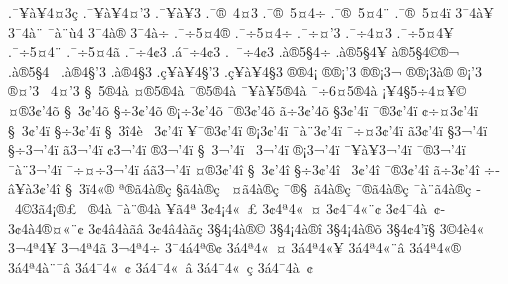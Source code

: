 {.^^af^^a5^^e0^^a54^^a43^^e7
.^^af^^a5^^e0^^a54^^a4'3
.^^af^^a5^^e0^^a53
.^^af^^ae^^ad^^a04^^a43
.^^af^^ae^^ad^^a05^^a44^^f7
.^^af^^ae^^ad^^a05^^a44^^a8
.^^af^^ae^^ad^^a05^^a44^^ef
3^^af4^^e0^^a5
3^^af4^^e0^^a8
^^af^^e0^^a8^^f94
3^^af4^^e0^^ae
3^^af4^^e0^^f7
.^^af^^f75^^a44^^ae
.^^af^^f75^^a44^^f7
.^^af^^f7^^a4'3
.^^af^^f74^^a43
.^^af^^f75^^a44^^a5
.^^af^^f75^^a44^^a8
.^^af^^f75^^a44^^e3
.^^af^^f74^^a23
.^^e1^^af^^f74^^a23
.^^ad^^a0^^af^^f74^^a23
.^^e0^^ae5^^a74^^f7
.^^e0^^ae5^^a74^^a5
^^e0^^ae5^^a74^^a9^^ae^^ac
.^^e0^^ae5^^a74^^a0
.^^e0^^ae4^^a7'3
.^^e0^^ae4^^a73
.^^e7^^a5^^e0^^a54^^a7'3
.^^e7^^a5^^e0^^a54^^a73
^^ae^^ae4^^a1
^^ae^^ae^^a1'3
^^ae^^ae^^a13^^ac
^^ae^^ae^^a13^^e0^^ae
^^ae^^a1'3
^^ae^^a4'3
^^ad^^a04^^a4'3
^^a7^^a05^^ae4^^e0
^^a4^^ae5^^ae4^^e0
^^af^^ae5^^ae4^^e0
^^af^^a5^^e0^^a55^^ae4^^e0
^^af^^f76^^a45^^ae4^^e0
^^a1^^a54^^a75^^f74^^a4^^a5^^a9
^^a4^^ae3^^a2'4^^f5
^^a7^^a03^^a2'4^^f5
^^a7^^f73^^a2'4^^f5
^^ae^^a1^^f73^^a2'4^^f5
^^af^^ae3^^a2'4^^f5
^^e3^^f73^^a2'4^^f5
^^a73^^a2'4^^ef
^^af^^ae3^^a2'4^^ef
^^a2^^f7^^a43^^a2'4^^ef
^^a7^^a03^^a2'4^^ef
^^a7^^f73^^a2'4^^ef
^^a7^^a03^^ee4^^e8
^^ad^^a03^^a2'4^^ef
^^ad^^a5^^af^^ae3^^a2'4^^ef
^^ae^^a13^^a2'4^^ef
^^af^^e0^^a83^^a2'4^^ef
^^af^^f7^^a43^^a2'4^^ef
^^e33^^a2'4^^ef
^^a73^^ac'4^^ef
^^a7^^f73^^ac'4^^ef
^^e33^^ac'4^^ef
^^a23^^ac'4^^ef
^^ad^^ae3^^ac'4^^ef
^^a7^^a03^^ac'4^^ef
^^ad^^a03^^ac'4^^ef
^^ae^^a13^^ac'4^^ef
^^af^^a5^^e0^^a53^^ac'4^^ef
^^af^^ae3^^ac'4^^ef
^^af^^e0^^a83^^ac'4^^ef
^^af^^f7^^a4^^f73^^ac'4^^ef
^^e1^^e33^^ac'4^^ef
^^a4^^ae3^^a2'4^^ee
^^a7^^a03^^a2'4^^ee
^^a7^^f73^^a2'4^^ee
^^ad^^a03^^a2'4^^ee
^^af^^ae3^^a2'4^^ee
^^e3^^f73^^a2'4^^ee
^^f7^^ad^^e2^^a5^^e03^^a2'4^^ee
^^a7^^a03^^ef4^^ab^^ae
^^aa^^ae^^e34^^e0^^ae^^e7
^^a7^^e34^^e0^^ae^^e7
^^ad^^a0^^a4^^e34^^e0^^ae^^e7
^^af^^ae^^a7^^a0^^e34^^e0^^ae^^e7
^^af^^ae^^e34^^e0^^ae^^e7
^^af^^e0^^a8^^e34^^e0^^ae^^e7
^^ad^^a04^^a93^^e34^^a1^^ae^^a3
^^ad^^a0^^ae4^^e0
^^af^^e0^^a8^^ae4^^e0
^^ad^^a5^^e34^^aa
3^^a24^^a14^^ab^^a0^^a3
3^^a24^^aa4^^ab^^a0^^a4
3^^a24^^af4^^ab^^a8^^a2
3^^a24^^af4^^e0^^a0^^a2^^ad
3^^a24^^e04^^ae^^a4^^ab^^a8^^a2
3^^a24^^e24^^e0^^e3^^e2
3^^a24^^e24^^e0^^e3^^e7
3^^a74^^a14^^e0^^ae^^a9
3^^a74^^a14^^e0^^ae^^ee
3^^a74^^a14^^e0^^ae^^f5
3^^a74^^a24'^^ef^^a7
3^^a94^^e84^^ab
3^^ac4^^aa4^^ad^^a5
3^^ac4^^aa4^^ad^^e3
3^^ac4^^aa4^^ad^^f7
3^^af4^^e14^^aa^^ae^^a2
3^^e14^^aa4^^ab^^a0^^a4
3^^e14^^aa4^^ab^^a5
3^^e14^^aa4^^ab^^a8^^e2
3^^e14^^aa4^^ab^^ae
3^^e14^^aa4^^e0^^a8^^af^^e2
3^^e14^^af4^^ab^^a0^^a2
3^^e14^^af4^^ab^^a0^^e2
3^^e14^^af4^^ab^^a0^^e7
3^^e14^^af4^^e0^^a0^^a2
}
